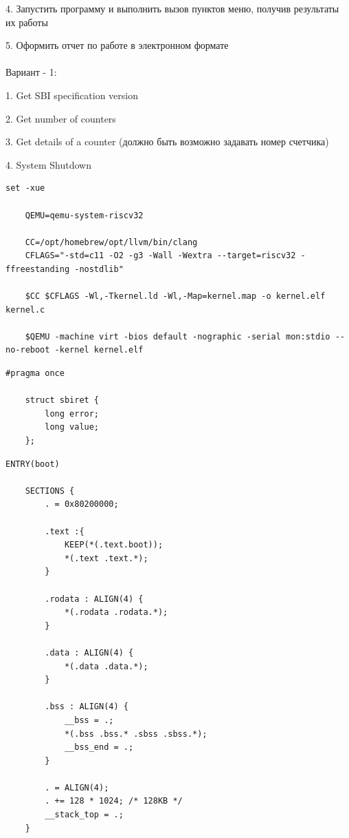 \documentclass{article}
\begin{document}
4. Запустить программу и выполнить вызов пунктов меню, получив результаты их
работы

5. Оформить отчет по работе в электронном формате
\\ \\
Вариант - 1:

1. Get SBI specification version

2. Get number of counters

3. Get details of a counter (должно быть возможно задавать
номер счетчика)

4. System Shutdown

\begin{lstlisting}[caption={run.sh}, label={lst:example}]
    set -xue

    QEMU=qemu-system-riscv32

    CC=/opt/homebrew/opt/llvm/bin/clang
    CFLAGS="-std=c11 -O2 -g3 -Wall -Wextra --target=riscv32 -ffreestanding -nostdlib"

    $CC $CFLAGS -Wl,-Tkernel.ld -Wl,-Map=kernel.map -o kernel.elf kernel.c

    $QEMU -machine virt -bios default -nographic -serial mon:stdio --no-reboot -kernel kernel.elf
\end{lstlisting}
    
\begin{lstlisting}[caption={kernel.h}, label={lst:example}]
    #pragma once

    struct sbiret {
        long error;
        long value;
    };
\end{lstlisting}

\begin{lstlisting}[caption={kernel.ld}, label={lst:example}]
    ENTRY(boot)

    SECTIONS {
        . = 0x80200000;

        .text :{
            KEEP(*(.text.boot));
            *(.text .text.*);
        }

        .rodata : ALIGN(4) {
            *(.rodata .rodata.*);
        }

        .data : ALIGN(4) {
            *(.data .data.*);
        }

        .bss : ALIGN(4) {
            __bss = .;
            *(.bss .bss.* .sbss .sbss.*);
            __bss_end = .;
        }

        . = ALIGN(4);
        . += 128 * 1024; /* 128KB */
        __stack_top = .;
    }
\end{lstlisting}
\end{document}
